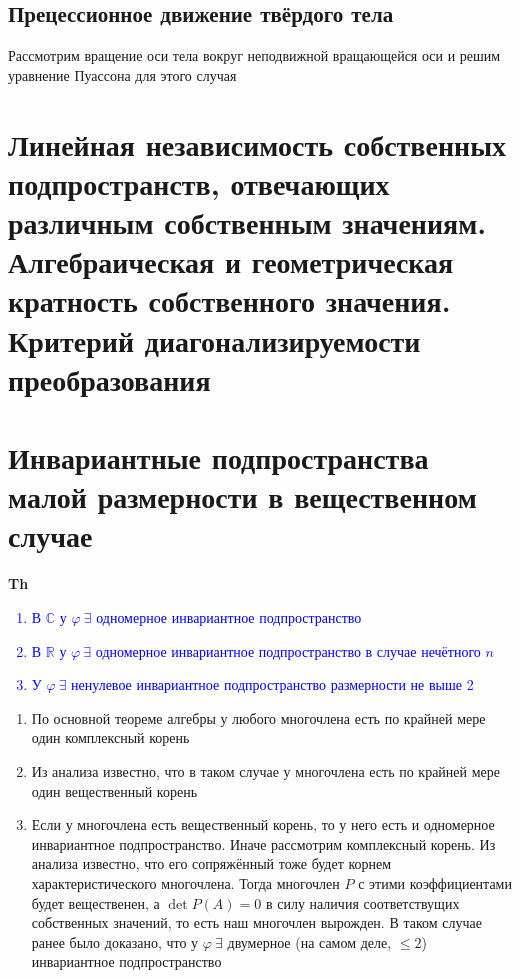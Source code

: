 \documentclass[a4paper, 14pt]{article}
\begin{document}
    \subsection{Прецессионное движение твёрдого тела}
    
    Рассмотрим вращение оси тела вокруг неподвижной вращающейся оси и решим уравнение Пуассона для этого случая
    
    \section{Линейная независимость собственных подпространств, отвечающих различным собственным значениям.
    Алгебраическая и геометрическая кратность собственного значения.
    Критерий диагонализируемости преобразования}
    
    
    
    \section{Инвариантные подпространства малой размерности в вещественном случае}
    
    \textbf{Th} \textcolor{blue}{
        \begin{enumerate}
            \item В $\mathbb{C}$ у $\varphi~\exists$ одномерное инвариантное подпространство
            \item В $\mathbb{R}$ у $\varphi~\exists$ одномерное инвариантное подпространство в случае нечётного $n$
            \item У $\varphi~\exists$ ненулевое инвариантное подпространство размерности не выше 2
        \end{enumerate}             }
    
    \begin{enumerate}
        \item По основной теореме алгебры у любого многочлена есть по крайней мере один комплексный корень
        \item Из анализа известно, что в таком случае у многочлена есть по крайней мере один вещественный корень
        \item Если у многочлена есть вещественный корень, то у него есть и одномерное инвариантное подпространство.
        Иначе рассмотрим комплексный корень.
        Из анализа известно, что его сопряжённый тоже будет корнем характеристического многочлена.
        Тогда многочлен $P$ с этими коэффициентами будет вещественен, а $\det P(A) = 0$ в силу наличия соответствущих
        собственных значений, то есть наш многочлен вырожден.
        В таком случае ранее было доказано, что у $\varphi~\exists$ двумерное (на самом деле, $\leq 2$) инвариантное
        подпространство
    \end{enumerate}
    
\end{document}
